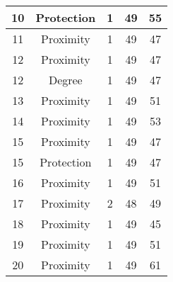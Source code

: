 \documentclass[results.tex]{subfiles}
\begin{document}
\begin{center}
\begin{tabular}{| c || c | c | c | c |}
            \hline
            10                      & Protection                   & 1                      & 49                      & 55                   \\
            \hline
            11                      & Proximity                    & 1                      & 49                      & 47                   \\
            \hline
            12                      & Proximity                    & 1                      & 49                      & 47                   \\
            \hline
            12                      & Degree                       & 1                      & 49                      & 47                   \\
            \hline
            13                      & Proximity                    & 1                      & 49                      & 51                   \\
            \hline
            14                      & Proximity                    & 1                      & 49                      & 53                   \\
            \hline
            15                      & Proximity                    & 1                      & 49                      & 47                   \\
            \hline
            15                      & Protection                   & 1                      & 49                      & 47                   \\
            \hline
            16                      & Proximity                    & 1                      & 49                      & 51                   \\
            \hline
            17                      & Proximity                    & 2                      & 48                      & 49                   \\
            \hline
            18                      & Proximity                    & 1                      & 49                      & 45                   \\
            \hline
            19                      & Proximity                    & 1                      & 49                      & 51                   \\
            \hline
            20                      & Proximity                    & 1                      & 49                      & 61                   \\

\end{tabular}
\end{center}
\end{document}
